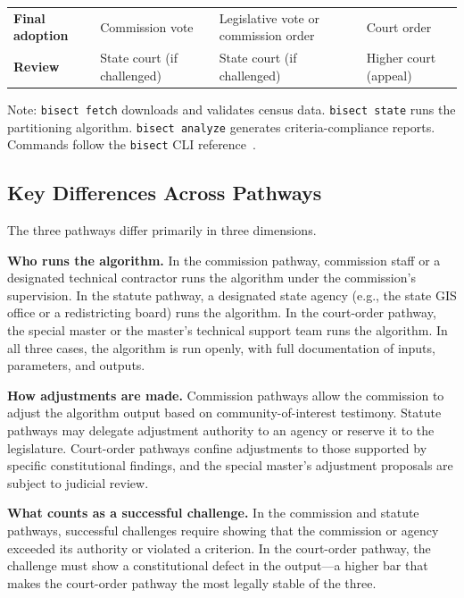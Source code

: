 \begin{table}[h]
\begin{threeparttable}
\begin{tabular}{p{2cm}p{3.5cm}p{3.5cm}p{3.5cm}}
\addlinespace
\textbf{Final adoption} &
Commission vote &
Legislative vote or commission order &
Court order \\
\addlinespace
\textbf{Review} &
State court (if challenged) &
State court (if challenged) &
Higher court (appeal) \\
\bottomrule
\end{tabular}
\begin{tablenotes}
\small
\item Note: \texttt{bisect fetch} downloads and validates census data.
  \texttt{bisect state} runs the partitioning algorithm.
  \texttt{bisect analyze} generates criteria-compliance reports.
  Commands follow the \texttt{bisect} CLI reference~\citep{redistCliQuickstart}.
\end{tablenotes}
\end{threeparttable}
\end{table}

\subsection{Key Differences Across Pathways}

The three pathways differ primarily in three dimensions.

\textbf{Who runs the algorithm.}  In the commission pathway, commission staff
or a designated technical contractor runs the algorithm under the commission's
supervision.  In the statute pathway, a designated state agency (e.g., the
state GIS office or a redistricting board) runs the algorithm.  In the
court-order pathway, the special master or the master's technical support team
runs the algorithm.  In all three cases, the algorithm is run openly, with
full documentation of inputs, parameters, and outputs.

\textbf{How adjustments are made.}  Commission pathways allow the commission
to adjust the algorithm output based on community-of-interest testimony.
Statute pathways may delegate adjustment authority to an agency or reserve it
to the legislature.  Court-order pathways confine adjustments to those
supported by specific constitutional findings, and the special master's
adjustment proposals are subject to judicial review.

\textbf{What counts as a successful challenge.}  In the commission and statute
pathways, successful challenges require showing that the commission or agency
exceeded its authority or violated a criterion.  In the court-order pathway,
the challenge must show a constitutional defect in the output---a higher bar
that makes the court-order pathway the most legally stable of the three.
